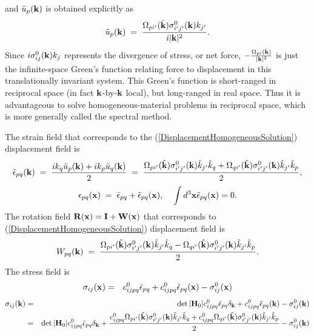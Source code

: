 \documentclass[12pt]{article}
\begin{document}
and $\tilde{u}_p({\bf k})$ is obtained
explicitly as 
\begin{equation}
 \tilde{u}_p({\bf k}) \;=\; 
 \frac{\Omega_{pi'}(\hat{\bf k})\sigma^0_{i'j'}({\bf k}) k_{j'}}
 {i|{\bf k}|^2}.
 \label{DisplacementHomogeneousSolution}
\end{equation}
Since $i\sigma^0_{ij}({\bf k}) k_j$ represents the divergence of
stress, or net force, $-\frac{\Omega_{pi}(\hat{\bf k})}{|{\bf k}|^2}$
is just the infinite-space Green's function relating force to
displacement in this translationally invariant system.  This Green's
function is short-ranged in reciprocal space (in fact ${\bf
k}$-by-${\bf k}$ local), but long-ranged in real space.  Thus it is
advantageous to solve homogeneous-material problems in reciprocal
space, which is more generally called the spectral method.

The strain field that corresponds to the
(\ref{DisplacementHomogeneousSolution}) displacement field is
\begin{equation}
 \tilde{\epsilon}_{pq}({\bf k}) \;=\; \frac{ik_q\tilde{u}_p({\bf k})+ik_p\tilde{u}_q({\bf k})}{2} \;=\;
\frac{\Omega_{pi'}(\hat{\bf k})\sigma^0_{i'j'}({\bf k}) \hat{k}_{j'}\hat{k}_q + 
      \Omega_{qi'}(\hat{\bf k})\sigma^0_{i'j'}({\bf k}) \hat{k}_{j'}\hat{k}_p}
 {2},
 \label{StrainHomogeneousSolution}
\end{equation}
\begin{equation}
 {\epsilon}_{pq}({\bf x}) \;=\; \bar{\epsilon}_{pq} + 
 \tilde{\epsilon}_{pq}({\bf x}), \;\;\;\;
 \int d^3{\bf x} \tilde{\epsilon}_{pq}({\bf x}) = 0.
\end{equation}
The rotation field ${\bf R}({\bf x})={\bf I}+{\bf W}({\bf x})$ 
that corresponds to
(\ref{DisplacementHomogeneousSolution}) displacement field is
\begin{equation}
 W_{pq}({\bf k}) \;=\; 
\frac{\Omega_{pi'}(\hat{\bf k})\sigma^0_{i'j'}({\bf k})\hat{k}_{j'}\hat{k}_q - 
      \Omega_{qi'}(\hat{\bf k})\sigma^0_{i'j'}({\bf k}) \hat{k}_{j'} \hat{k}_p}
 {2}.
\end{equation}
The stress field is
\begin{eqnarray}
 \sigma_{ij}({\bf x}) =&& c_{ijpq}^0\bar{\epsilon}_{pq} 
+ c_{ijpq}^0\tilde{\epsilon}_{pq}({\bf x}) - \sigma^0_{ij}({\bf x})
 \label{StressHomogeneousSolutionRealSpace}
\end{eqnarray}
\begin{eqnarray}
 \sigma_{ij}({\bf k}) =&& \det|{\bf H}_0|c_{ijpq}^0\bar{\epsilon}_{pq} 
\delta_{\bf k}+
c_{ijpq}^0\tilde{\epsilon}_{pq}({\bf k}) 
- \sigma^0_{ij}({\bf k}) \label{StressHomogeneousSolutionkSpace}\\
=&& \det|{\bf H}_0|c_{ijpq}^0\bar{\epsilon}_{pq} 
\delta_{\bf k}+
\frac{c_{ijpq}^0\Omega_{pi'}(\hat{\bf k})\sigma^0_{i'j'}({\bf k}) 
\hat{k}_{j'} \hat{k}_q + 
      c_{ijpq}^0\Omega_{qi'}(\hat{\bf k})\sigma^0_{i'j'}({\bf k}) 
\hat{k}_{j'} \hat{k}_p}
 {2}
- \sigma^0_{ij}({\bf k}) \nonumber  
\end{eqnarray}
\end{document}
